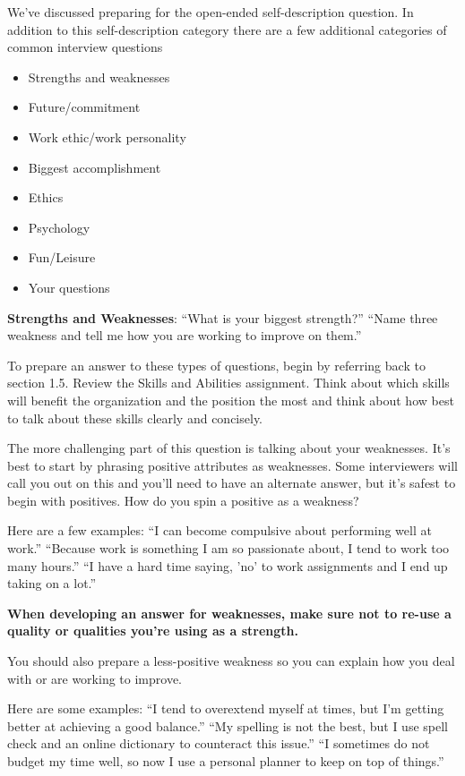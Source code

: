 We've discussed preparing for the open-ended self-description question. In addition to this self-description category there are a few additional categories of common interview questions
\begin{itemize}[leftmargin=*]
\item Strengths and weaknesses
\item Future/commitment
\item Work ethic/work personality
\item Biggest accomplishment
\item Ethics
\item Psychology
\item Fun/Leisure
\item Your questions
\end{itemize}
\textbf{Strengths and Weaknesses}: 
\break ``What is your biggest strength?'' 
\break ``Name three weakness and tell me how you are working to improve on them.''

To prepare an answer to these types of questions, begin by referring back to section 1.5. Review the Skills and Abilities assignment. Think about which skills will benefit the organization and the position the most and think about how best to talk about these skills clearly and concisely.

The more challenging part of this question is talking about your weaknesses. It's best to start by phrasing positive attributes as weaknesses. Some interviewers will call you out on this and you'll need to have an alternate answer, but it's safest to begin with positives. How do you spin a positive as a weakness? 

Here are a few examples:
\break ``I can become compulsive about performing well at work.''
\break ``Because work is something I am so passionate about, I tend to work too many hours.'' 
\break ``I have a hard time saying, 'no' to work assignments and I end up taking on a lot.''

\textbf{When developing an answer for weaknesses, make sure not to re-use a quality or qualities you're using as a strength.}

You should also prepare a less-positive weakness so you can explain how you deal with or are working to improve. 

Here are some examples:
\break ``I tend to overextend myself at times, but I'm getting better at achieving a good balance.''
\break ``My spelling is not the best, but I use spell check and an online dictionary to counteract this issue.'' 
\break ``I sometimes do not budget my time well, so now I use a personal planner to keep on top of things.''
 
